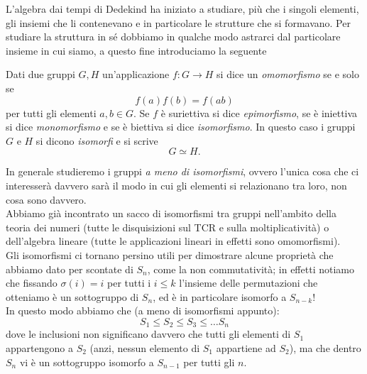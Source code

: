 \documentclass[11pt]{scrartcl}
\begin{document}
	L'algebra dai tempi di Dedekind ha iniziato a studiare, più che i singoli elementi, gli insiemi che li contenevano e in particolare le strutture che si formavano. Per studiare la struttura in sé dobbiamo in qualche modo astrarci dal particolare insieme in cui siamo, a questo fine introduciamo la seguente 
	\begin{definition}
		Dati due gruppi $G,H$ un'applicazione $f:G\to H$ si dice un \textit{omomorfismo} se e solo se
		$$f(a)f(b)=f(ab)$$
		per tutti gli elementi $a,b\in G$. Se $f$ è suriettiva si dice \textit{epimorfismo}, se è iniettiva si dice \textit{monomorfismo} e se è biettiva si dice \textit{isomorfismo}. In questo caso i gruppi $G$ e $H$ si dicono \textit{isomorfi} e si scrive
		$$G\simeq H.$$
	\end{definition} 
	In generale studieremo i gruppi \textit{a meno di isomorfismi}, ovvero l'unica cosa che ci interesserà davvero sarà il modo in cui gli elementi si relazionano tra loro, non cosa sono davvero. \\
	Abbiamo già incontrato un sacco di isomorfismi tra gruppi nell'ambito della teoria dei numeri (tutte le disquisizioni sul TCR e sulla moltiplicatività) o dell'algebra lineare (tutte le applicazioni lineari in effetti sono omomorfismi). \\
	Gli isomorfismi ci tornano persino utili per dimostrare alcune proprietà che abbiamo dato per scontate di $S_n$, come la non commutatività; in effetti notiamo che fissando $\sigma(i)=i$ per tutti i $i\le k$ l'insieme delle permutazioni che otteniamo è un sottogruppo di $S_n$, ed è in particolare isomorfo a $S_{n-k}$! \\
	In questo modo abbiamo che (a meno di isomorfismi appunto):
	$$S_{1}\le S_2 \le S_3 \le\dots S_n $$ 
	dove le inclusioni non significano davvero che tutti gli elementi di $S_1$ appartengono a $S_2$ (anzi, nessun elemento di $S_1$ appartiene ad $S_2$), ma che dentro $S_n$ vi è un sottogruppo isomorfo a $S_{n-1}$ per tutti gli $n$.
	
\end{document}
